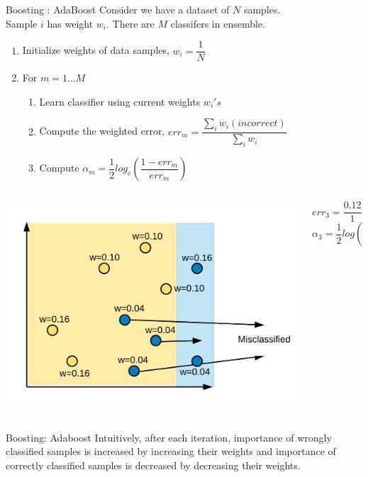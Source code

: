 \documentclass{beamer}
\begin{document}
\begin{frame}{Boosting : AdaBoost }
Consider we have a dataset of $N$ samples.\\
Sample $i$ has weight $w_i$. There are $M$ classifers in ensemble.\\
\begin{enumerate}
	\item Initialize weights of data samples, $w_i = \dfrac{1}{N}$
	\item For $m = 1\dots M$
	\begin{enumerate}
		\item Learn classifier using current weights $w_i's$
		\item Compute the weighted error, $err_m = \dfrac{\sum\limits_iw_i(incorrect)}{\sum\limits_iw_i}$
		\item Compute $\alpha_m = \dfrac{1}{2}log_e\left(\dfrac{1 - err_m}{err_m}\right)$
	\end{enumerate}
\end{enumerate}
\begin{columns}
	\begin{column}{0.5\textwidth}
		\centering
		\includegraphics[width = \textwidth]{ada_iter3_misclassify}
	\end{column}
	\begin{column}{0.5\textwidth}
		$err_3 = \dfrac{0.12}{1}$\\
		$\alpha_3 = \dfrac{1}{2}log\left(\dfrac{1-0.12}{0.12}\right) = 0.99$
	\end{column}
\end{columns}
\end{frame}
	
	\begin{frame}{Boosting: Adaboost}
	Intuitively, after each iteration, importance of wrongly classified samples is increased by increasing their weights and importance of correctly classified 		samples is decreased by decreasing their weights.
	\end{frame}
	
\end{document}

